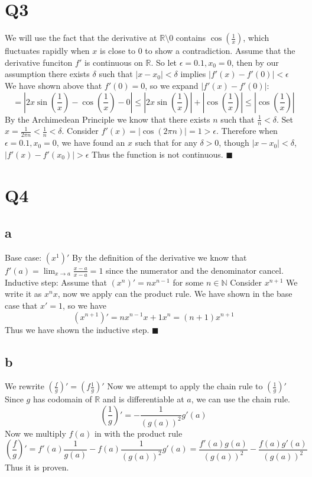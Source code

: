 \documentclass[12pt]{article}
\newcommand{\N}{\mathbb{N}}
\newcommand{\R}{\mathbb{R}}
\begin{document}
\section{Q3}
We will use the fact that the derivative at $\R \setminus 0$ contains $\cos(\frac{1}{x})$, which fluctuates rapidly when $x$ is close to 0 to show a contradiction.
\newline
Assume that the derivative funciton $f'$ is continuous on $\R$. So let $\epsilon = 0.1, x_0=0$, then by our assumption there exists $\delta$ such that $|x-x_0|<\delta$ implies $|f'(x)-f'(0)|<\epsilon$
\newline
We have shown above that $f'(0)=0$, so we expand $|f'(x)-f'(0)|$:
$$=|2x\sin(\frac{1}{x})-\cos(\frac{1}{x})-0| \leq |2x\sin(\frac{1}{x})|+|\cos(\frac{1}{x})| \leq |\cos(\frac{1}{x})|$$
\newline
By the Archimedean Principle we know that there exists $n$ such that $\frac{1}{n}<\delta$. Set $x = \frac{1}{2\pi n} <\frac{1}{n}<\delta$. Consider $f'(x) = |\cos(2\pi n)| = 1 > \epsilon$.
\newline
Therefore when $\epsilon=0.1, x_0=0$, we have found an $x$ such that for any $\delta > 0$, though $|x-x_0|<\delta$, $|f'(x)-f'(x_0)|>\epsilon$
\newline
Thus the function is not continuous.
$\blacksquare$
\newpage


\section{Q4}

\subsection{a}
Base case:
\newline
$(x^1)'$ By the definition of the derivative we know that $f'(a)=\lim_{x \to a} \frac{x-a}{x-a} = 1$ since the numerator and the denominator cancel.
\newline
Inductive step:
\newline
Assume that $(x^n)' = nx^{n-1}$ for some $n \in \N$ Consider $x^{n+1}$
\newline
We write it as $x^nx$, now we apply can the product rule. We have shown in the base case that $x'=1$, so we have
$$(x^{n+1})' = nx^{n-1}x + 1x^{n} = (n+1)x^{n+1}$$
Thus we have shown the inductive step. $\blacksquare$


\subsection{b}
We rewrite $(\frac{f}{g})' = (f\frac{1}{g})'$ Now we attempt to apply the chain rule to $(\frac{1}{g})'$
\newline
Since $g$ has codomain of $\R$ and is differentiable at $a$, we can use the chain rule.
$$(\frac{1}{g})' = -\frac{1}{(g(a))^2}g'(a)$$
Now we multiply $f(a)$ in with the product rule
$$(\frac{f}{g})' = f'(a)\frac{1}{g(a)}-f(a)\frac{1}{(g(a))^2}g'(a)
= \frac{f'(a)g(a)}{(g(a))^2}-\frac{f(a)g'(a)}{(g(a))^2}$$
Thus it is proven.
\newpage
\end{document}
